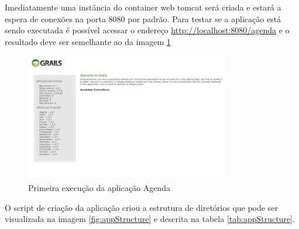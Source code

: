 \documentclass[12pt]{article}
\begin{document}
    Imediatamente uma instância do container web tomcat será criada e estará a
    espera de conexões na porta 8080 por padrão. Para testar se a aplicação está
    sendo executada é possível acessar o endereço \url{http://localhost:8080/agenda} 
    e o resultado deve ser semelhante ao da imagem \ref{fig:firstRun}
    
    \begin{figure}[h!]
    \centering
    \includegraphics[width=0.8\textwidth]{images/firstRun.jpg}
    \caption{Primeira execução da aplicação Agenda}
    \label{fig:firstRun}
    \end{figure}
    
    O script de criação da aplicação criou a estrutura de diretórios que pode ser
    visualizada na imagem \ref{fig:appStructure} e descrita na tabela \ref{tab:appStructure}.
    
\end{document}
